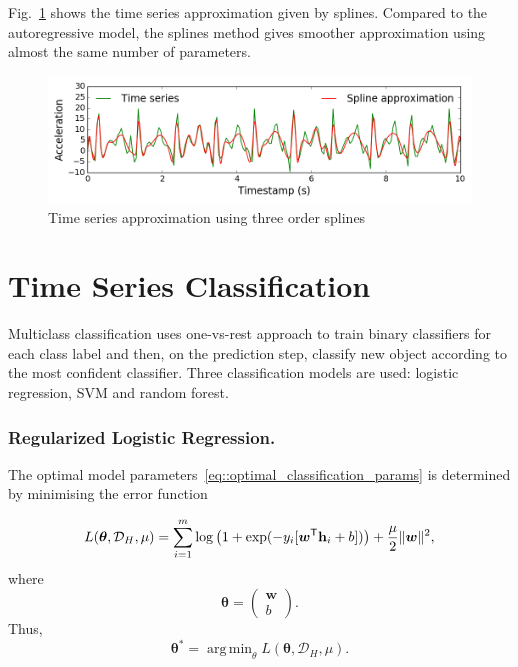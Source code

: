 \documentclass{llncs}
\DeclareMathOperator*{\argmin}{arg\,min}
\newcommand{\T}{{\mbox{\scriptsize\sffamily\upshape\mdseries T}}}
\begin{document}
Fig.~\ref{fig::spline_example} shows the time series approximation given by splines. 
Compared to the autoregressive model, the splines method gives smoother approximation using almost the same number of parameters.

\begin{figure}[h]
	\centering
	\includegraphics[width=1\linewidth]{pics/spline_example.png}
	\caption{Time series approximation using three order splines}
	\label{fig::spline_example}
\end{figure}

\section{Time Series Classification}
Multiclass classification uses one-vs-rest approach to train binary classifiers for each class label and then, on the prediction step, classify new object according to the most confident classifier. Three classification models are used: logistic regression, SVM and random forest.

\subsubsection{Regularized Logistic Regression.}
The optimal model parameters~\eqref{eq::optimal_classification_params} is determined by minimising the error function

\begin{equation*}
L(\bm{\theta}, \mathcal{D}_H, \mu) = \sum_{i=1}^{m} \log\left(1 + \exp(-y_i [\bm{w}^{\T} \mathbf{h}_i + b])\right) + \frac{\mu}{2} \|\bm{w}\|^2,
\end{equation*}
where 
\begin{equation*}
\bm{\theta}  = \begin{pmatrix}
\bm{w} \\ b
\end{pmatrix}.
\end{equation*}
Thus, 
\begin{equation*}
\bm{\theta}^* = \argmin_{\mathbb{\theta}} L(\bm{\theta}, \mathcal{D}_H, \mu).
\end{equation*}
\end{document}
